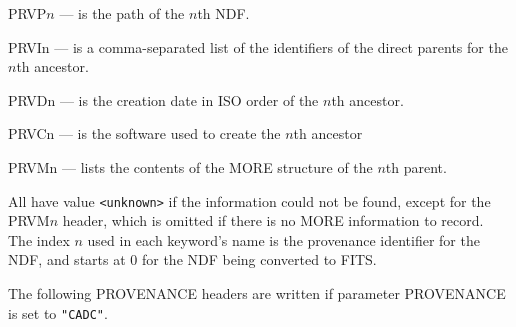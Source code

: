 \documentclass[twoside,11pt]{starlink}
\begin{document}
{{{         \sstitem
         PRVP$n$ --- is the path of the $n$th NDF.

         \sstitem
         PRVIn --- is a comma-separated list of the identifiers of the
           direct parents for the $n$th ancestor.

         \sstitem
         PRVDn --- is the creation date in ISO order of the $n$th ancestor.

         \sstitem
         PRVCn --- is the software used to create the $n$th ancestor

         \sstitem
         PRVMn --- lists the contents of the MORE structure of the $n$th
           parent.
      }
      All have value \texttt{<unknown>} if the information could not be found,
      except for the PRVM$n$ header, which is omitted if there is no MORE
      information to record.   The index $n$ used in each keyword's name
      is the provenance identifier for the NDF, and starts at 0 for the
      NDF being converted to FITS.

      The following PROVENANCE headers are written if parameter
      PROVENANCE is set to \texttt{"CADC"}.


}}
\end{document}
